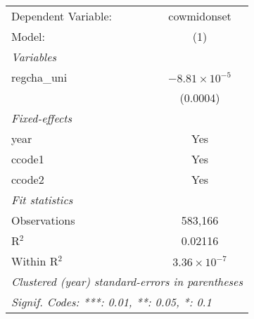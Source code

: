 \begingroup
\centering
\begin{tabular}{lc}
   \tabularnewline \midrule \midrule
   Dependent Variable: & cowmidonset\\  
   Model:              & (1)\\  
   \midrule
   \emph{Variables}\\
   regcha\_uni         & $-8.81\times 10^{-5}$\\    
                       & (0.0004)\\   
   \midrule
   \emph{Fixed-effects}\\
   year                & Yes\\  
   ccode1              & Yes\\  
   ccode2              & Yes\\  
   \midrule
   \emph{Fit statistics}\\
   Observations        & 583,166\\  
   R$^2$               & 0.02116\\  
   Within R$^2$        & $3.36\times 10^{-7}$\\   
   \midrule \midrule
   \multicolumn{2}{l}{\emph{Clustered (year) standard-errors in parentheses}}\\
   \multicolumn{2}{l}{\emph{Signif. Codes: ***: 0.01, **: 0.05, *: 0.1}}\\
\end{tabular}
\par\endgroup


